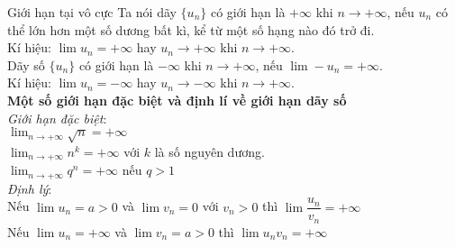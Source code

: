 \begin{dang}{Giới hạn tại vô cực}
		Ta nói dãy $\{u_n\}$ có giới hạn là $+ \infty$ khi $n \rightarrow + \infty$, nếu $u_n$ có thể lớn hơn một số dương bất kì, kể từ một số hạng nào đó trở đi. \\
	Kí hiệu: $\lim u_n = + \infty$ hay $u_n \rightarrow + \infty$ khi $n \rightarrow + \infty$. \\ 
	Dãy số $\{u_n\}$ có giới hạn là $- \infty$ khi $n \rightarrow + \infty$, nếu $\lim - u_n = + \infty$. \\
	Kí hiệu: $\lim u_n = - \infty$ hay $u_n \rightarrow - \infty$ khi $n \rightarrow + \infty$. \\ 
	\textbf{Một số giới hạn đặc biệt và định lí về giới hạn dãy số} \\
	\textit{Giới hạn đặc biệt}: \\
	$\displaystyle \lim_{n \rightarrow + \infty} \sqrt{n} = + \infty$ \\
	$\displaystyle \lim_{n \rightarrow + \infty} n^k = + \infty$ với $k$ là số nguyên dương. \\
	$\displaystyle \lim_{n \rightarrow + \infty} q^n = + \infty$ nếu $q > 1$ \\
	\textit{Định lý}: \\
	Nếu $\lim u_n = a > 0$ và $\lim v_n = 0$ với $v_n > 0$ thì $\lim \dfrac{u_n}{v_n} = + \infty$ \\
	Nếu $\lim u_n = + \infty$ và $\lim v_n = a > 0$ thì $\lim u_nv_n = + \infty$ \\
\end{dang}

